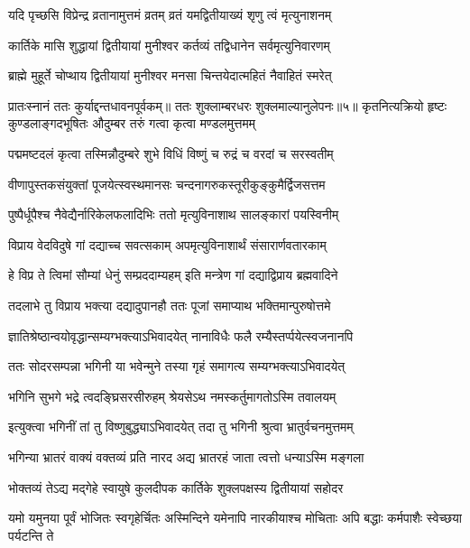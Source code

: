 \twolineshloka
{यदि पृच्छसि विप्रेन्द्र व्रतानामुत्तमं व्रतम्}
{व्रतं यमद्वितीयाख्यं शृणु त्वं मृत्युनाशनम्} %

\twolineshloka
{कार्तिके मासि शुद्धायां द्वितीयायां मुनीश्वर}
{कर्तव्यं तद्विधानेन सर्वमृत्युनिवारणम्} %

\twolineshloka
{ब्राह्मे मुहूर्ते चोप्थाय द्वितीयायां मुनीश्वर}
{मनसा चिन्तयेदात्महितं नैवाहितं स्मरेत्} %


प्रातःस्नानं ततः कुर्याद्दन्तधावनपूर्वकम्॥
ततः शुक्लाम्बरधरः शुक्लमाल्यानुलेपनः॥५॥
\twolineshloka
{कृतनित्यक्रियो हृष्टः कुण्डलाङ्गदभूषितः}
{औदुम्बर तरुं गत्वा कृत्वा मण्डलमुत्तमम्} %

\twolineshloka
{पद्ममष्टदलं कृत्वा तस्मिन्नौदुम्बरे शुभे}
{विधिं विष्णुं च रुद्रं च वरदां च सरस्वतीम्} %

\twolineshloka
{वीणापुस्तकसंयुक्तां पूजयेत्स्वस्थमानसः}
{चन्दनागरुकस्तूरीकुङ्कुमैर्द्विजसत्तम} %

\twolineshloka
{पुष्पैर्धूपैश्च नैवेद्यैर्नारिकेलफलादिभिः}
{ततो मृत्युविनाशाथ सालङ्कारां पयस्विनीम्} %

\twolineshloka
{विप्राय वेदविदुषे गां दद्याच्च सवत्सकाम्}
{अपमृत्युविनाशार्थं संसारार्णवतारकाम्} %

\twolineshloka
{हे विप्र ते त्विमां सौम्यां धेनुं सम्प्रददाम्यहम्}
{इति मन्त्रेण गां दद्याद्विप्राय ब्रह्मवादिने} %

\twolineshloka
{तदलाभे तु विप्राय भक्त्या दद्यादुपानहौ}
{ततः पूजां समाप्याथ भक्तिमान्पुरुषोत्तमे} %

\twolineshloka
{ज्ञातिश्रेष्ठान्वयोवृद्धान्सम्यग्भक्त्याऽभिवादयेत्}
{नानाविधैः फलै रम्यैस्तर्प्पयेत्स्वजनानपि} %

\twolineshloka
{ततः सोदरसम्पन्ना भगिनी या भवेन्मुने}
{तस्या गृहं समागत्य सम्यग्भक्त्याऽभिवादयेत्} %

\twolineshloka
{भगिनि सुभगे भद्रे त्वदङ्घ्रिसरसीरुहम्}
{श्रेयसेऽथ नमस्कर्तुमागतोऽस्मि तवालयम्} %

\twolineshloka
{इत्युक्त्वा भगिनीं तां तु विष्णुबुद्ध्याऽभिवादयेत्}
{तदा तु भगिनी श्रुत्वा भ्रातुर्वचनमुत्तमम्} %

\twolineshloka
{भगिन्या भ्रातरं वाक्यं वक्तव्यं प्रति नारद}
{अद्य भ्रातरहं जाता त्वत्तो धन्याऽस्मि मङ्गला} %

\twolineshloka
{भोक्तव्यं तेऽद्य मद्गेहे स्वायुषे कुलदीपक}
{कार्तिके शुक्लपक्षस्य द्वितीयायां सहोदर} %

\threelineshloka
{यमो यमुनया पूर्वं भोजितः स्वगृहेर्चितः}
{अस्मिन्दिने यमेनापि नारकीयाश्च मोचिताः}
{अपि बद्धाः कर्मपाशैः स्वेच्छया पर्यटन्ति ते} %

